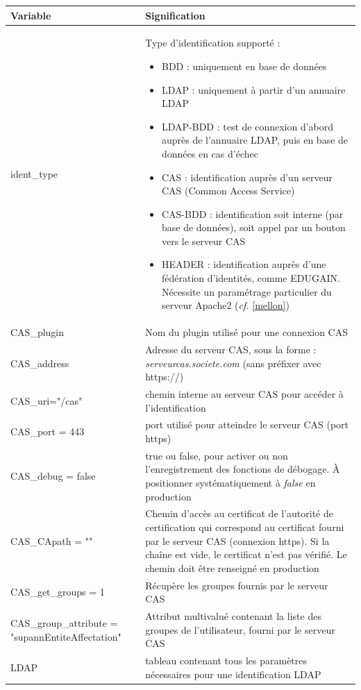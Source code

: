 \begin{longtable}{|p{6cm}|p{10cm}|}
\hline
\textbf{Variable} & \textbf{Signification} \\
\hline
\endhead
ident\_type & Type d'identification supporté :
\begin{itemize}
	\item BDD : uniquement en base de données
	\item LDAP : uniquement à partir d'un annuaire LDAP
	\item LDAP-BDD : test de connexion d'abord auprès de l'annuaire LDAP, puis en base de données en cas d'échec
	\item CAS : identification auprès d'un serveur CAS (Common Access Service)
	\item CAS-BDD : identification soit interne (par base de données), soit appel par un bouton vers le serveur CAS
	\item HEADER : identification auprès d'une fédération d'identités, comme EDUGAIN. Nécessite un paramétrage particulier du serveur Apache2 (\textit{cf.} \ref{mellon})
\end{itemize}
\\
\hline
CAS\_plugin & Nom du plugin utilisé pour une connexion CAS \\
\hline
CAS\_address & Adresse du serveur CAS, sous la forme : \textit{serveurcas.societe.com} (sans préfixer avec https://)\\
\hline
CAS\_uri="/cas" & chemin interne au serveur CAS pour accéder à l'identification \\
\hline
CAS\_port = 443 & port utilisé pour atteindre le serveur CAS (port https)\\
\hline
CAS\_debug = false & true ou false, pour activer ou non l'enregistrement des fonctions de débogage. À positionner systématiquement à \textit{false} en production \\
\hline
CAS\_CApath = "" & Chemin d'accès au certificat de l'autorité de certification qui correspond au certificat fourni par le serveur CAS (connexion https). Si la chaîne est vide, le certificat n'est pas vérifié. Le chemin doit être renseigné en production \\
\hline
CAS\_get\_groups = 1 & Récupère les groupes fournis par le serveur CAS \\
\hline
CAS\_group\_attribute = "supannEntiteAffectation" & Attribut multivalué contenant la liste des groupes de l'utilisateur, fourni par le serveur CAS \\
\hline
LDAP & tableau contenant tous les paramètres nécessaires pour une identification LDAP \\

\end{longtable}

